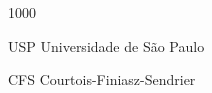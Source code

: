 \begin{listofabbrv}{1000}
	\item [USP] Universidade de São Paulo
	\item [CFS] Courtois-Finiasz-Sendrier
\end{listofabbrv}